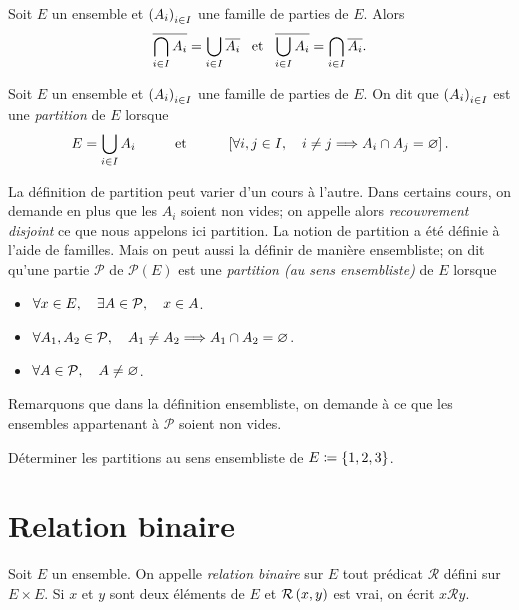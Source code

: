 \documentclass{magnolia}
\begin{document}
\begin{proposition}[utile=-3]
Soit $E$ un ensemble et $\left(A_i\right)_{i\in I}$ une famille de parties de $E$. Alors
\[\overline{\bigcap\limits_{i\in I} A_i}=\bigcup\limits_{i\in I} \overline{A_i} \quad\!\text{et}\quad\!
  \overline{\bigcup\limits_{i\in I} A_i}=\bigcap\limits_{i\in I} \overline{A_i}.\]
\end{proposition}

\begin{definition}[utile=-3, nom=Partition]
Soit $E$ un ensemble et $\left(A_i\right)_{i\in I}$ une famille de parties de $E$.
On dit que $\left(A_i\right)_{i\in I}$ est une \emph{partition} de $E$ lorsque
\[E = \bigcup_{i\in I} A_i \qquad\quad\!\text{et}\quad\!\qquad \left[\forall i,j\in I,\quad i\neq j\Longrightarrow
  A_i\cap A_j=\varnothing\right].\]
\end{definition}

\begin{remarques}
\remarque La définition de partition peut varier d'un cours à l'autre.
  Dans certains cours, on demande en plus que les $A_i$ soient non vides; on appelle
  alors \emph{recouvrement disjoint} ce que nous appelons ici partition.
\remarque La notion de partition a été définie à l'aide de familles. Mais on peut aussi
  la définir de manière ensembliste; on dit qu'une partie $\mathcal{P}$ de
  $\mathcal{P}(E)$ est une \emph{partition (au sens ensembliste)} de $E$ lorsque  
  \begin{itemize}
  \item $\forall x\in E,\quad \exists A\in\mathcal{P},\quad x\in A$.
  \item $\forall A_1, A_2\in\mathcal{P},\quad A_1\neq A_2\Longrightarrow A_1\cap A_2=\varnothing$.
  \item $\forall A\in\mathcal{P},\quad A\neq\varnothing$. 
  \end{itemize}
  Remarquons que dans la définition ensembliste, on demande à ce que les ensembles appartenant à $\mathcal{P}$
  soient non vides.
\end{remarques}

\begin{exoUnique}
\exo Déterminer les partitions au sens ensembliste de $E\coloneqq\left\{1,2,3\right\}$.
\end{exoUnique}

\section{Relation binaire}

\begin{definition}[utile=-3]
Soit $E$ un ensemble. On appelle \emph{relation binaire} sur $E$ tout prédicat
$\mathcal{R}$ défini sur $E\times E$. Si $x$ et $y$ sont deux
éléments de $E$ et $\mathcal{R}\left(x,y\right)$ est vrai, on écrit $x\mathcal{R} y$.
\end{definition}
\end{document}
